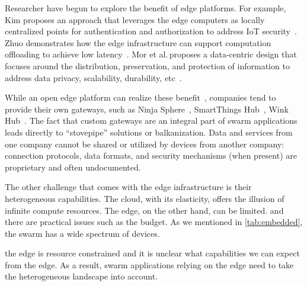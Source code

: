 Researcher have begun to explore the benefit of edge platforms. For example, Kim
proposes an approach that leverages the edge computers as locally centralized
points for authentication and authorization to address IoT
security~\cite{kim2017securing}. Zhuo demonstrates how the edge infrastructure
can support computation offloading to achieve low
latency~\cite{chen2018application}. Mor et al.\,proposes a data-centric design
that focuses around the distribution, preservation, and protection of
information to address data privacy, scalability, durability,
etc~\cite{mor2016toward}.

While an open edge platform can realize these
benefit~\cite{zachariah1001internet}, companies tend to provide their own
gateways, such as Ninja Sphere~\cite{ninja}, SmartThings Hub~\cite{smartthings},
Wink Hub~\cite{wink}. The fact that custom gateways are an integral part of
swarm applications leads directly to ``stovepipe'' solutions or
balkanization. Data and services from one company cannot be shared or utilized
by devices from another company: connection protocols, data formats, and
security mechanisms (when present) are proprietary and often undocumented.

The other challenge that comes with the edge infrastructure is their
heterogeneous capabilities. The cloud, with its elasticity, offers the illusion
of infinite compute resources. The edge, on the other hand, can be limited. and
there are practical issues such as the budget. As we mentioned in
\autoref{tab:embedded}, the swarm has a wide spectrum of devices.

the edge is resource constrained and it is unclear what capabilities we can
expect from the edge. As a result, swarm applications relying on the edge need
to take the heterogeneous landscape into account.


